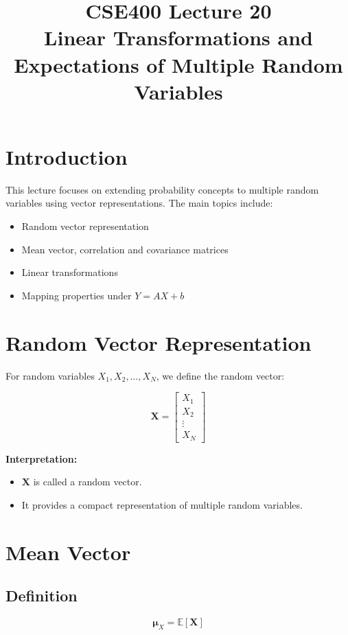 \documentclass[11pt]{article}
\title{\textbf{CSE400 Lecture 20}\\
Linear Transformations and Expectations of Multiple Random Variables}
\author{}
\date{}
\begin{document}
\maketitle

\section{Introduction}

This lecture focuses on extending probability concepts to multiple random variables using vector representations. The main topics include:
\begin{itemize}
    \item Random vector representation
    \item Mean vector, correlation and covariance matrices
    \item Linear transformations
    \item Mapping properties under $Y = AX + b$
\end{itemize}

\section{Random Vector Representation}

For random variables $X_1, X_2, \dots, X_N$, we define the random vector:

\[
\mathbf{X} =
\begin{bmatrix}
X_1 \\
X_2 \\
\vdots \\
X_N
\end{bmatrix}
\]

\textbf{Interpretation:}
\begin{itemize}
    \item $\mathbf{X}$ is called a random vector.
    \item It provides a compact representation of multiple random variables.
\end{itemize}

\section{Mean Vector}

\subsection{Definition}

\[
\boldsymbol{\mu}_X = \mathbb{E}[\mathbf{X}]
\]
\end{document}
